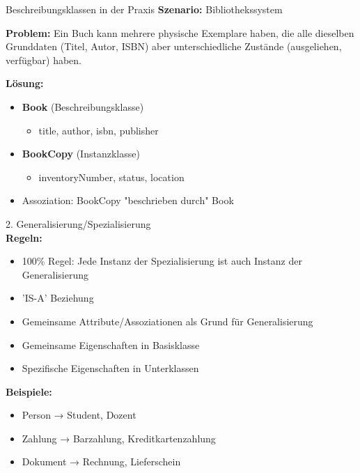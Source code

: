 \begin{example2}{Beschreibungsklassen in der Praxis}
\textbf{Szenario:} Bibliothekssystem

\textbf{Problem:} 
Ein Buch kann mehrere physische Exemplare haben, die alle dieselben Grunddaten (Titel, Autor, ISBN) aber unterschiedliche Zustände (ausgeliehen, verfügbar) haben.

\textbf{Lösung:}
\begin{itemize}
    \item \textbf{Book} (Beschreibungsklasse)
    \begin{itemize}
        \item title, author, isbn, publisher
    \end{itemize}
    \item \textbf{BookCopy} (Instanzklasse)
    \begin{itemize}
        \item inventoryNumber, status, location
    \end{itemize}
    \item Assoziation: BookCopy "beschrieben durch" Book
\end{itemize}
\end{example2}

\begin{concept}{2. Generalisierung/Spezialisierung}\\
\textbf{Regeln:}
\begin{itemize}
    \item 100\% Regel: Jede Instanz der Spezialisierung ist auch Instanz der Generalisierung
    \item 'IS-A' Beziehung
    \item Gemeinsame Attribute/Assoziationen als Grund für Generalisierung
    \item Gemeinsame Eigenschaften in Basisklasse
    \item Spezifische Eigenschaften in Unterklassen
\end{itemize}

\textbf{Beispiele:}
\begin{itemize}
    \item Person → Student, Dozent
    \item Zahlung → Barzahlung, Kreditkartenzahlung
    \item Dokument → Rechnung, Lieferschein
\end{itemize}
\end{concept}

